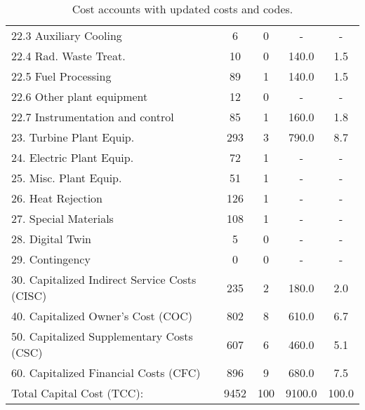 \begin{table}[h!]
{\begin{tabular}{lcccc}
\hspace{10mm}22.3 Auxiliary Cooling & 6 & 0 & - & - \\
\hspace{10mm}22.4 Rad. Waste Treat. & 10 & 0 & 140.0 & 1.5 \\
\hspace{10mm}22.5 Fuel Processing & 89 & 1 & 140.0 & 1.5 \\
\hspace{10mm}22.6 Other plant equipment & 12 & 0 & - & - \\
\hspace{10mm}22.7 Instrumentation and control & 85 & 1 & 160.0 & 1.8 \\
\hspace{5mm}23. Turbine Plant Equip. & 293 & 3 & 790.0 & 8.7 \\
\hspace{5mm}24. Electric Plant Equip. & 72 & 1 & - & - \\
\hspace{5mm}25. Misc. Plant Equip. & 51 & 1 & - & - \\
\hspace{5mm}26. Heat Rejection & 126 & 1 & - & - \\
\hspace{5mm}27. Special Materials & 108 & 1 & - & - \\
\hspace{5mm}28. Digital Twin & 5 & 0 & - & - \\
\hspace{5mm}29. Contingency & 0 & 0 & - & - \\
30. Capitalized Indirect Service Costs (CISC) & 235 & 2 & 180.0 & 2.0 \\
40. Capitalized Owner’s Cost (COC) & 802 & 8 & 610.0 & 6.7 \\
50. Capitalized Supplementary Costs (CSC) & 607 & 6 & 460.0 & 5.1 \\
60. Capitalized Financial Costs (CFC) & 896 & 9 & 680.0 & 7.5 \\
\hline
Total Capital Cost (TCC): & 9452 & 100 & 9100.0 & 100.0 \\
\hline
\end{tabular}
}
\caption{Cost accounts with updated costs and codes. }
\label{tab:costsupdatedcodes}
\end{table}


